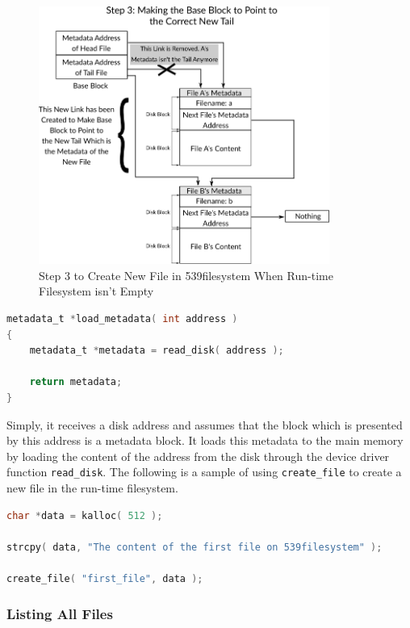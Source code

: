 \begin{figure}
\centering
\includegraphics[width=0.85000\textwidth]{Figures/filesystem-ch/create_file_not_empty_case_step3.png}
\caption{Step 3 to Create New File in 539filesystem When Run-time
Filesystem isn't Empty}\label{fig:create_file_not_empty_case_3}
\end{figure}

\begin{lstlisting}[language=C]
metadata_t *load_metadata( int address )
{
    metadata_t *metadata = read_disk( address );
    
    return metadata;
}
\end{lstlisting}

Simply, it receives a disk address and assumes that the block which is
presented by this address is a metadata block. It loads this metadata to
the main memory by loading the content of the address from the disk
through the device driver function \lstinline!read_disk!. The following
is a sample of using \lstinline!create_file! to create a new file in the
run-time filesystem.

\begin{lstlisting}[language=C]
char *data = kalloc( 512 );

strcpy( data, "The content of the first file on 539filesystem" );
    
create_file( "first_file", data );
\end{lstlisting}

\subsubsection{Listing All Files}\label{listing-all-files}

